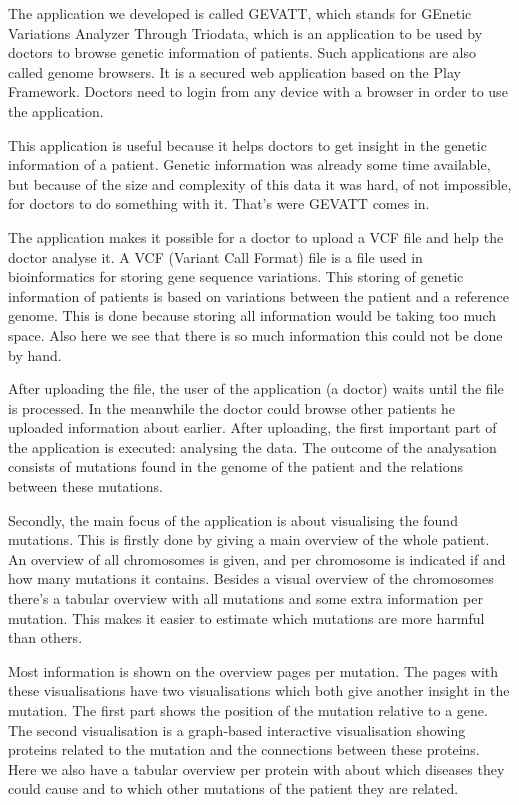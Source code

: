 The application we developed is called GEVATT, which stands for GEnetic Variations Analyzer Through Triodata, which is an application to be used by doctors to browse genetic information of patients. Such applications are also called genome browsers. It is a secured web application based on the Play Framework. Doctors need to login from any device with a browser in order to use the application.

This application is useful because it helps doctors to get insight in the genetic information of a patient. Genetic information was already some time available, but because of the size and complexity of this data it was hard, of not impossible, for doctors to do something with it. That's were GEVATT comes in.

The application makes it possible for a doctor to upload a VCF file and help the doctor analyse it. A VCF (Variant Call Format) file is a file used in bioinformatics for storing gene sequence variations. This storing of genetic information of patients is based on variations between the patient and a reference genome. This is done because storing all information would be taking too much space. Also here we see that there is so much information this could not be done by hand.

After uploading the file, the user of the application (a doctor) waits until the file is processed. In the meanwhile the doctor could browse other patients he uploaded information about earlier. After uploading, the first important part of the application is executed: analysing the data. The outcome of the analysation consists of mutations found in the genome of the patient and the relations between these mutations.

Secondly, the main focus of the application is about visualising the found mutations. This is firstly done by giving a main overview of the whole patient. An overview of all chromosomes is given, and per chromosome is indicated if and how many mutations it contains. Besides a visual overview of the chromosomes there's a tabular overview with all mutations and some extra information per mutation. This makes it easier to estimate which mutations are more harmful than others.

Most information is shown on the overview pages per mutation. The pages with these visualisations have two visualisations which both give another insight in the mutation. The first part shows the position of the mutation relative to a gene. The second visualisation is a graph-based interactive visualisation showing proteins related to the mutation and the connections between these proteins. Here we also have a tabular overview per protein with about which diseases they could cause and to which other mutations of the patient they are related.